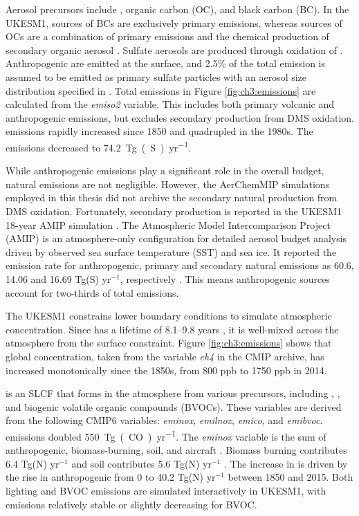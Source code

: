 Aerosol precursors include , organic carbon (OC), and black carbon (BC). In the UKESM1, sources of BCs are exclusively primary emissions, whereas sources of OCs are a combination of primary emissions and the chemical production of secondary organic aerosol \citep{mulcahyDescriptionEvaluationAerosol2020}. Sulfate aerosols are produced through oxidation of . Anthropogenic  are emitted at the surface, and 2.5\% of the total emission is assumed to be emitted as primary sulfate particles with an aerosol size distribution specified in \citep{stierAerosolclimateModelECHAM5HAM2005}. Total  emissions in Figure \ref{fig:ch3:emissions} are calculated from the \textit{emiso2} variable. This includes both primary volcanic and anthropogenic  emissions, but excludes secondary production from DMS oxidation.  emissions rapidly increased since 1850 and quadrupled in the 1980s. The emissions decreased to \qty{74.2}{Tg(S)~yr^{-1}}.

While anthropogenic  emissions play a significant role in the overall  budget, natural emissions are not negligible. However, the AerChemMIP simulations employed in this thesis did not archive the secondary natural  production from DMS oxidation. Fortunately, secondary production is reported in the UKESM1 18-year AMIP simulation \citep{mulcahyDescriptionEvaluationAerosol2020}. The Atmospheric Model Intercomparison Project (AMIP) is an atmosphere-only configuration for detailed aerosol budget analysis driven by observed sea surface temperature (SST) and sea ice. It reported the emission rate for anthropogenic, primary and secondary natural  emissions as 60.6, 14.06 and 16.69 Tg(S) yr$^{-1}$, respectively \citep{mulcahyDescriptionEvaluationAerosol2020}. This means anthropogenic sources account for two-thirds of total emissions.

The UKESM1 constrains lower boundary conditions to simulate atmospheric  concentration. Since  has a lifetime of 8.1--9.8 years \citep{oconnorAssessmentPreindustrialPresentday2021}, it is well-mixed across the atmosphere from the surface constraint. Figure \ref{fig:ch3:emissions} shows that global  concentration, taken from the variable \textit{ch4} in the CMIP archive, has increased monotonically since the 1850s, from 800 ppb to 1750 ppb in 2014. 

 is an SLCF that forms in the atmosphere from various precursors, including , , and biogenic volatile organic compounds (BVOCs). These variables are derived from the following CMIP6 variables: \textit{eminox}, \textit{emilnox}, \textit{emico}, and \textit{emibvoc}.  emissions doubled \qty{550}{Tg(CO)~yr^{-1}}. The \textit{eminox} variable is the sum of anthropogenic, biomass-burning, soil, and aircraft . Biomass burning contributes 6.4 Tg(N) yr$^{-1}$ and soil contributes 5.6 Tg(N) yr$^{-1}$ \citep{archibaldDescriptionEvaluationUKCA2020}. The increase in  is driven by the rise in anthropogenic  from 0 to 40.2 Tg(N) yr$^{-1}$ between 1850 and 2015. Both lighting  and BVOC emissions are simulated interactively in UKESM1, with emissions relatively stable or slightly decreasing for BVOC. 



